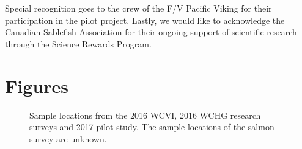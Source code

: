 \documentclass[12pt]{article}\usepackage[]{graphicx}\usepackage[]{color}
\begin{document}
Special recognition goes to the crew of the F/V Pacific Viking for their participation in the pilot project. Lastly, we would like to acknowledge the Canadian Sablefish Association for their ongoing support of scientific research through the Science Rewards Program.

\clearpage

\hypertarget{figures}{%
\section{Figures}\label{figures}}


\begin{figure}[htb]

{\centering {} 

}

\caption{Sample locations from the 2016 WCVI, 2016 WCHG research surveys and 2017 pilot study. The sample locations of the salmon survey are unknown.}\label{fig:figure1}
\end{figure}
\end{document}

